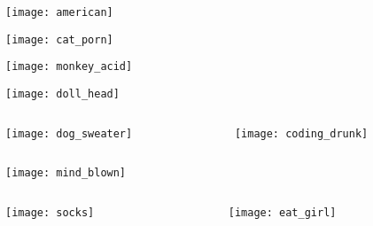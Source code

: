 \documentclass{beamer}
\begin{document}
\begin{frame}
  \texttt{[image: american]}

\end{frame}

\begin{frame}
  \texttt{[image: cat\_porn]}

\end{frame}

\begin{frame}
  \begin{center}
    \texttt{[image: monkey\_acid]}
  \end{center}
  
\end{frame}

\begin{frame}
  \texttt{[image: doll\_head]}
  
\end{frame}

\begin{frame}
  \begin{columns}
    \begin{column}{0.5\textwidth}
      \texttt{[image: dog\_sweater]}
    \end{column}
    \begin{column}{0.5\textwidth}
      \texttt{[image: coding\_drunk]}
    \end{column}
  \end{columns}

\end{frame}

\begin{frame}
  \begin{center}
    \texttt{[image: mind\_blown]}
  \end{center}
  
\end{frame}

\begin{frame}
  \begin{columns}
    \begin{column}{0.5\textwidth}
      \texttt{[image: socks]}
    \end{column}
    \begin{column}{0.5\textwidth}
      \texttt{[image: eat\_girl]}
    \end{column}
  \end{columns}
\end{frame}
\end{document}
